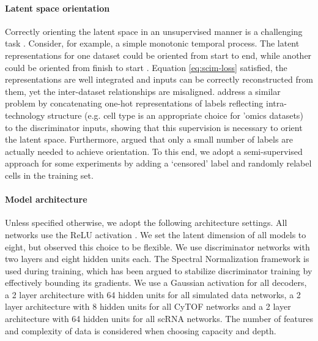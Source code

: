 \paragraph{Latent space orientation}
Correctly orienting the latent space in an unsupervised manner is a challenging task \cite{Locatello2019,Uhler2019}.
Consider, for example, a simple monotonic temporal process.
The latent representations for one dataset could be oriented from start to end, while another could be oriented from finish to start \cite{Welch2017}.
Equation \ref{eq:scim-loss} satisfied, the representations are well integrated and inputs can be correctly reconstructed from them, yet the inter-dataset relationships are misaligned.
\citet{Makhzani2015} address a similar problem by concatenating one-hot representations of labels reflecting intra-technology structure (e.g. cell type is an appropriate choice for ’omics datasets) to the discriminator inputs, showing that this supervision is necessary to orient the latent space.
Furthermore, \citet{Locatello2019} argued that only a small number of labels are actually needed to achieve orientation.
To this end, we adopt a semi-supervised approach for some experiments by adding a ‘censored’ label and randomly relabel cells in the training set.

\paragraph{Model architecture}
Unless specified otherwise, we adopt the following architecture settings.
All networks use the ReLU activation \cite{agarap2018}.
We set the latent dimension of all models to eight, but observed this choice to be flexible.
We use discriminator networks with two layers and eight hidden units each.
The Spectral Normalization framework \cite{Miyato2018} is used during training, which has been argued to stabilize discriminator training by effectively bounding its gradients.
We use a Gaussian activation for all decoders, a 2 layer architecture with 64 hidden units for all simulated data networks, a 2 layer architecture with 8 hidden units for all CyTOF networks and a 2 layer architecture with 64 hidden units for all scRNA networks.
The number of features and complexity of data is considered when choosing capacity and depth.

